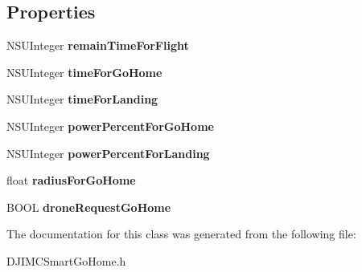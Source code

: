 \subsection*{Properties}
\begin{DoxyCompactItemize}
\item 
\hypertarget{interface_d_j_i_m_c_smart_go_home_data_ac1b8d2714eb85f9c38c216ada484f7d8}{N\+S\+U\+Integer {\bfseries remain\+Time\+For\+Flight}}\label{interface_d_j_i_m_c_smart_go_home_data_ac1b8d2714eb85f9c38c216ada484f7d8}

\item 
\hypertarget{interface_d_j_i_m_c_smart_go_home_data_a5704e59eb614cde4296b2127c1fcb210}{N\+S\+U\+Integer {\bfseries time\+For\+Go\+Home}}\label{interface_d_j_i_m_c_smart_go_home_data_a5704e59eb614cde4296b2127c1fcb210}

\item 
\hypertarget{interface_d_j_i_m_c_smart_go_home_data_ae280122e70f4f1168dd02f237b468260}{N\+S\+U\+Integer {\bfseries time\+For\+Landing}}\label{interface_d_j_i_m_c_smart_go_home_data_ae280122e70f4f1168dd02f237b468260}

\item 
\hypertarget{interface_d_j_i_m_c_smart_go_home_data_a8e9fbbdecd3912100d1d9a38b8fc0023}{N\+S\+U\+Integer {\bfseries power\+Percent\+For\+Go\+Home}}\label{interface_d_j_i_m_c_smart_go_home_data_a8e9fbbdecd3912100d1d9a38b8fc0023}

\item 
\hypertarget{interface_d_j_i_m_c_smart_go_home_data_a7f95c8777ba25ceb9e9522ab25f02188}{N\+S\+U\+Integer {\bfseries power\+Percent\+For\+Landing}}\label{interface_d_j_i_m_c_smart_go_home_data_a7f95c8777ba25ceb9e9522ab25f02188}

\item 
\hypertarget{interface_d_j_i_m_c_smart_go_home_data_ae513310a32691fc240fe3722b266c03d}{float {\bfseries radius\+For\+Go\+Home}}\label{interface_d_j_i_m_c_smart_go_home_data_ae513310a32691fc240fe3722b266c03d}

\item 
\hypertarget{interface_d_j_i_m_c_smart_go_home_data_aa37f6b80c036ff0d5bbdbe01928c7726}{B\+O\+O\+L {\bfseries drone\+Request\+Go\+Home}}\label{interface_d_j_i_m_c_smart_go_home_data_aa37f6b80c036ff0d5bbdbe01928c7726}

\end{DoxyCompactItemize}


The documentation for this class was generated from the following file\+:\begin{DoxyCompactItemize}
\item 
D\+J\+I\+M\+C\+Smart\+Go\+Home.\+h\end{DoxyCompactItemize}
